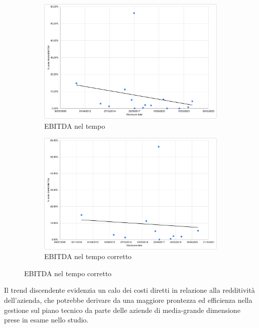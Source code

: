 \documentclass[12pt,a4paper,openright,twoside]{report}
\begin{document}
\begin{figure}[H]
    \centering
    \begin{subfigure}{0.48\textwidth}
        \centering
        \includegraphics[width=1\linewidth]{figures/ebit-date-1.png}
        \caption{EBITDA nel tempo}
        \label{fig:ebit1}
    \end{subfigure}
    \begin{subfigure}{0.48\textwidth}
        \centering
    \includegraphics[width=1\linewidth]{figures/ebit-date-2.png}
    \caption{EBITDA nel tempo corretto}
    \label{fig:ebit2}
    \end{subfigure}
\end{figure}
Il trend discendente evidenzia un calo dei costi diretti in relazione alla redditivit\`a dell'azienda, che potrebbe derivare da una maggiore prontezza ed efficienza nella gestione sul piano tecnico da parte delle aziende di media-grande dimensione prese in esame nello studio.\\
\end{document}
